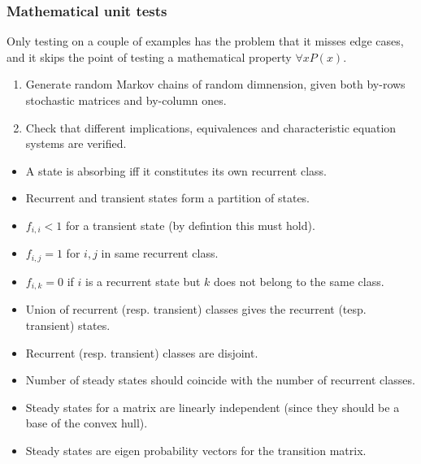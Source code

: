 \begin{frame}\frametitle{Mathematical unit tests}
    \vspace{2.5em}
    
    Only testing on a couple of examples has the problem that it misses edge cases, and 
    it skips the point of testing a mathematical property \(\forall x P(x)\).
    
    \begin{enumerate}
    \item Generate random Markov chains of random dimnension, given both by-rows 
    stochastic matrices and by-column ones.
    \item Check that different implications, equivalences and characteristic 
    equation systems are verified.
    \end{enumerate}

    \begin{itemize}
    \item A state is absorbing iff it constitutes its own recurrent class.
    \item Recurrent and transient states form a partition of states.
    \item \(f_{i,i} < 1\) for a transient state (by defintion this must hold).
    \item \(f_{i,j} = 1\) for \(i,j\) in same recurrent class.
    \item \(f_{i,k} = 0\) if \(i\) is a recurrent state but \(k\) does not belong to 
    the same class.
    \item Union of recurrent (resp. transient) classes gives the recurrent (tesp. transient) states.
    \item Recurrent (resp. transient) classes are disjoint.
    \item Number of steady states should coincide with the number of recurrent classes.
    \item Steady states for a matrix are linearly independent (since they should be a base of the convex hull).
    \item Steady states are eigen probability vectors for the transition matrix.
    \end{itemize}

\end{frame}

